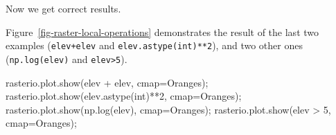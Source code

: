 \documentclass[
  letterpaper,
]{krantz}
\newenvironment{Shaded}{\begin{snugshade}}{\end{snugshade}}
\newcommand{\BuiltInTok}[1]{\textcolor[rgb]{0.00,0.23,0.31}{#1}}
\newcommand{\DecValTok}[1]{\textcolor[rgb]{0.68,0.00,0.00}{#1}}
\newcommand{\NormalTok}[1]{\textcolor[rgb]{0.00,0.23,0.31}{#1}}
\newcommand{\OperatorTok}[1]{\textcolor[rgb]{0.37,0.37,0.37}{#1}}
\newcommand{\StringTok}[1]{\textcolor[rgb]{0.13,0.47,0.30}{#1}}
\begin{document}
Now we get correct results.

Figure~\ref{fig-raster-local-operations} demonstrates the result of the
last two examples (\texttt{elev+elev} and \texttt{elev.astype(int)**2}),
and two other ones (\texttt{np.log(elev)} and
\texttt{elev\textgreater{}5}).

\begin{Shaded}
\begin{Highlighting}[]
\NormalTok{rasterio.plot.show(elev }\OperatorTok{+}\NormalTok{ elev, cmap}\OperatorTok{=}\StringTok{\textquotesingle{}Oranges\textquotesingle{}}\NormalTok{)}\OperatorTok{;}
\NormalTok{rasterio.plot.show(elev.astype(}\BuiltInTok{int}\NormalTok{)}\OperatorTok{**}\DecValTok{2}\NormalTok{, cmap}\OperatorTok{=}\StringTok{\textquotesingle{}Oranges\textquotesingle{}}\NormalTok{)}\OperatorTok{;}
\NormalTok{rasterio.plot.show(np.log(elev), cmap}\OperatorTok{=}\StringTok{\textquotesingle{}Oranges\textquotesingle{}}\NormalTok{)}\OperatorTok{;}
\NormalTok{rasterio.plot.show(elev }\OperatorTok{\textgreater{}} \DecValTok{5}\NormalTok{, cmap}\OperatorTok{=}\StringTok{\textquotesingle{}Oranges\textquotesingle{}}\NormalTok{)}\OperatorTok{;}
\end{Highlighting}
\end{Shaded}
\end{document}
